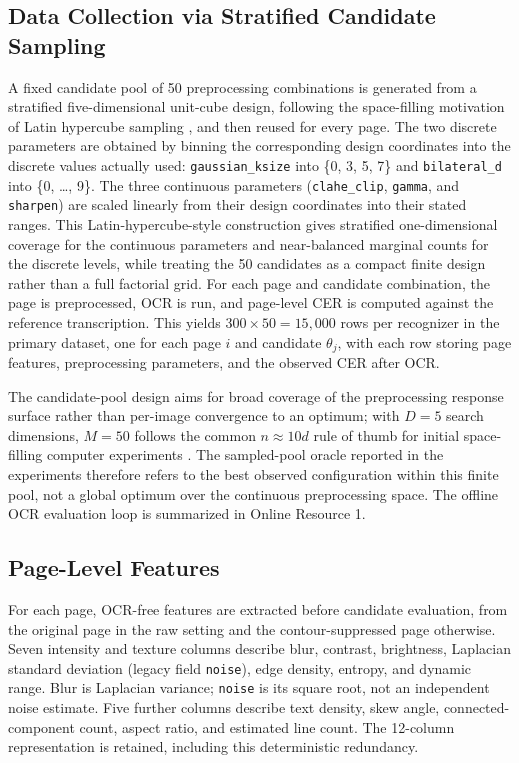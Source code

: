 \documentclass[pdflatex,sn-basic,Numbered,iicol]{sn-jnl}
\begin{document}
\subsection{Data Collection via Stratified Candidate Sampling}

A fixed candidate pool of 50 preprocessing combinations is generated from a stratified five-dimensional unit-cube design, following the space-filling motivation of Latin hypercube sampling \cite{mckay1979lhs}, and then reused for every page. The two discrete parameters are obtained by binning the corresponding design coordinates into the discrete values actually used: \texttt{gaussian\_ksize} into \{0, 3, 5, 7\} and \texttt{bilateral\_d} into \{0, \ldots, 9\}. The three continuous parameters (\texttt{clahe\_clip}, \texttt{gamma}, and \texttt{sharpen}) are scaled linearly from their design coordinates into their stated ranges. This Latin-hypercube-style construction gives stratified one-dimensional coverage for the continuous parameters and near-balanced marginal counts for the discrete levels, while treating the 50 candidates as a compact finite design rather than a full factorial grid. For each page and candidate combination, the page is preprocessed, OCR is run, and page-level CER is computed against the reference transcription. This yields $300 \times 50 = 15{,}000$ rows per recognizer in the primary dataset, one for each page $i$ and candidate $\theta_j$, with each row storing page features, preprocessing parameters, and the observed CER after OCR.

The candidate-pool design aims for broad coverage of the preprocessing response surface rather than per-image convergence to an optimum; with $D=5$ search dimensions, $M=50$ follows the common $n\approx 10d$ rule of thumb for initial space-filling computer experiments \cite{loeppky2009sample}. The sampled-pool oracle reported in the experiments therefore refers to the best observed configuration within this finite pool, not a global optimum over the continuous preprocessing space. The offline OCR evaluation loop is summarized in Online Resource 1.

\subsection{Page-Level Features}

For each page, OCR-free features are extracted before candidate evaluation, from the original page in the raw setting and the contour-suppressed page otherwise. Seven intensity and texture columns describe blur, contrast, brightness, Laplacian standard deviation (legacy field \texttt{noise}), edge density, entropy, and dynamic range. Blur is Laplacian variance; \texttt{noise} is its square root, not an independent noise estimate. Five further columns describe text density, skew angle, connected-component count, aspect ratio, and estimated line count. The 12-column representation is retained, including this deterministic redundancy.
\end{document}
